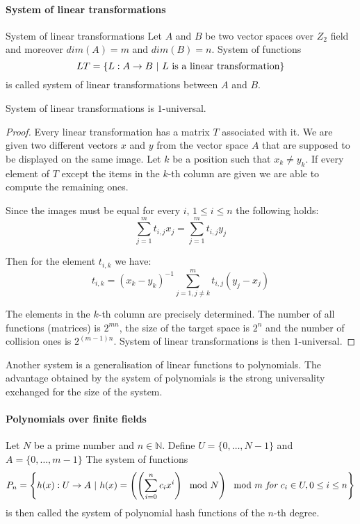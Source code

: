 \paragraph{System of linear transformations}
\begin{definition}{System of linear transformations}
Let $A$ and $B$ be two vector spaces over $Z_2$ field and moreover $dim(A) = m$ and $dim(B) = n$. System of functions \[ LT = \{L : A \rightarrow B \ | \  L \text{ is a linear transformation}\} \] is called system of linear transformations between $A$ and $B$.
\end{definition}
\begin{remark}
System of linear transformations is $1$-universal.
\end{remark}
\begin{proof}
Every linear transformation has a matrix $T$ associated with it. We are given two different vectors $x$ and $y$ from the vector space $A$ that are supposed to be displayed on the same image. Let $k$ be a position such that $x_k \neq y_k$. If every element of $T$ except the items in the $k$-th column are given we are able to compute the remaining ones. 

Since the images must be equal for every $i$, $1 \leq i \leq n$ the following holds:
\[
\displaystyle\sum_{j = 1}^{m}t_{i, j}x_j = \displaystyle\sum_{j = 1}^{m}t_{i, j}y_j
\]

Then for the element $t_{i, k}$ we have:
\[
t_{i, k} = (x_k - y_k)^{-1}\displaystyle\sum_{j = 1, j \neq k}^{m}t_{i, j}(y_j - x_j)
\]

The elements in the $k$-th column are precisely determined. The number of all functions (matrices) is $2^{mn}$, the size of the target space is $2^n$ and the number of collision ones is $2^{(m-1)n}$. System of linear transformations is then $1$-universal.
\end{proof}

Another system is a generalisation of linear functions to polynomials. The advantage obtained by the system of polynomials is the strong universality exchanged for the size of the system.

\paragraph{Polynomials over finite fields}
\begin{definition}
Let $N$ be a prime number and $n \in \mathbb{N}$. Define $U = \{0, \dots, N - 1 \}$ and $A = \{0, \dots, m - 1\}$ The system of functions \[ P_n = \left\lbrace h(x): U \rightarrow A \ | \  h(x) = \left( \left(\displaystyle \sum_{i=0}^{n} c_i x^i \right) \mod N \right) \mod m \textit{ for } c_i \in U, 0 \leq i \leq n \right\rbrace \] is then called the system of polynomial hash functions of the $n$-th degree.
\end{definition}

